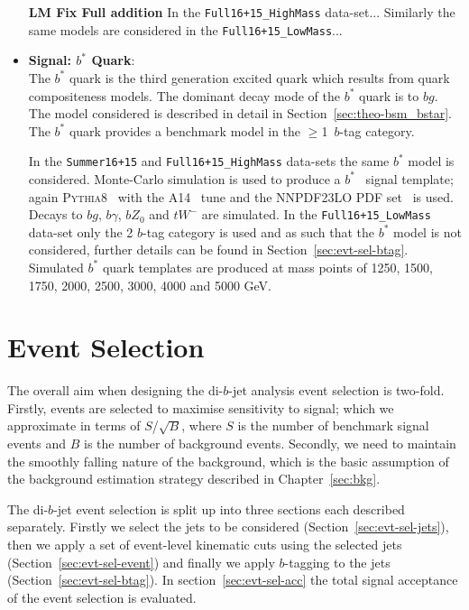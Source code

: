\begin{itemize}[leftmargin=*]
  \textbf{LM Fix Full addition}
  In the \verb|Full16+15_HighMass| data-set...
  Similarly the same models are considered in the \verb|Full16+15_LowMass|... \\

\item\textbf{Signal: $b^*$ Quark}: \\
  The $b^*$ quark is the third generation excited quark which results from
  quark compositeness models.
  The dominant decay mode of the  $b^*$ quark is to $bg$.
  The model considered is
  described in detail in Section~\ref{sec:theo-bsm_bstar}.
  The $b^*$ quark provides a benchmark model in the $\geq$1~$b$-tag category.
    
  
  In the \verb|Summer16+15| and \verb|Full16+15_HighMass|
  data-sets the same $b^*$ model is considered.
  Monte-Carlo simulation is used to produce a $b^*$ \mjj~signal template;
  again \textsc{Pythia8}~\cite{dibjet-pythia8} with the A14~\cite{dibjet-a14} tune and the NNPDF23LO PDF set~\cite{dibjet-nnpdf} is used.
  Decays to $bg$, $b\gamma$, $bZ_0$ and $tW^{-}$ are simulated.
  In the \verb|Full16+15_LowMass| data-set
  only the 2 $b$-tag category is used
  and as such that the $b^*$ model is not considered,
  further details can be found in Section~\ref{sec:evt-sel-btag}.
  Simulated $b^*$ quark templates are produced at mass points of
  1250, 1500, 1750, 2000, 2500, 3000, 4000 and 5000 GeV.
\end{itemize}

\section{Event Selection}
\label{sec:evt-sel}

The overall aim when designing the di-$b$-jet analysis event selection
is two-fold.
Firstly, events are selected to
maximise sensitivity to signal;
which we approximate in terms of $S$/$\sqrt{B}$,
where $S$ is the number of benchmark signal events and $B$ is the number of background events.
Secondly, we need to maintain the smoothly falling nature of the background,
which is the basic assumption of the background estimation strategy
described in Chapter~\ref{sec:bkg}.

The di-$b$-jet event selection is split up into three sections each described separately.
Firstly we select the jets to be considered (Section~\ref{sec:evt-sel-jets}),
then we apply a set of event-level kinematic cuts using the selected jets (Section~\ref{sec:evt-sel-event})
and finally we apply $b$-tagging to the jets (Section~\ref{sec:evt-sel-btag}).
In section~\ref{sec:evt-sel-acc} the total signal acceptance of the
event selection is evaluated.

